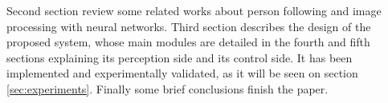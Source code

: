 


Second section review some related works about person following and image processing with neural networks. Third section describes the design of the proposed system, whose main modules are detailed in the fourth and fifth sections explaining its perception side and its control side. It has been implemented and experimentally validated, as it will be seen on section \ref{sec:experiments}. Finally some brief conclusions finish the paper.